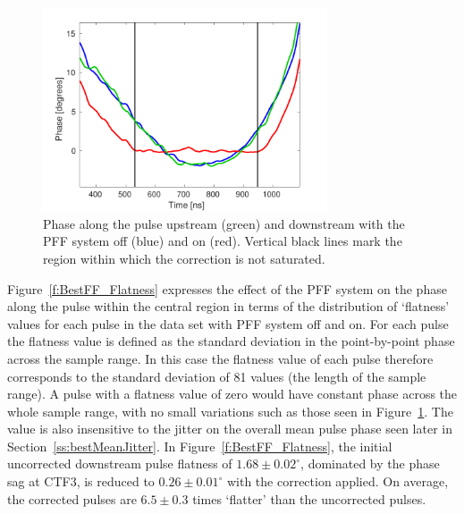 \begin{figure}
  \centering
  \includegraphics[width=0.75\textwidth]{Figures/feedforward/BestFF_MeanPhaseAlong}
  \caption{Phase along the pulse upstream (green) and downstream with the PFF system off (blue) and on (red). Vertical black lines mark the region within which the correction is not saturated.}
  \label{f:BestFF_MeanPhaseAlong}
\end{figure}

Figure~\ref{f:BestFF_Flatness} expresses the effect of the PFF system on the phase along the pulse within the central region in terms of the distribution of `flatness' values for each pulse in the data set with PFF system off and on. For each pulse the flatness value is defined as the standard deviation in the point-by-point phase across the sample range. In this case the flatness value of each pulse therefore corresponds to the standard deviation of 81 values (the length of the sample range). A pulse with a flatness value of zero would have constant phase across the whole sample range, with no small variations such as those seen in Figure~\ref{f:BestFF_MeanPhaseAlong}. The value is also insensitive to the jitter on the overall mean pulse phase seen later in Section~\ref{ss:bestMeanJitter}. In Figure~\ref{f:BestFF_Flatness}, the initial uncorrected downstream pulse flatness of \(1.68\pm0.02^\circ\), dominated by the phase sag at CTF3, is reduced to \(0.26\pm0.01^\circ\) with the correction applied. On average, the corrected pulses are \(6.5\pm0.3\) times `flatter' than the uncorrected pulses.

